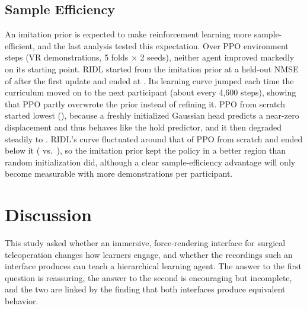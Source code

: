 \documentclass[utf8]{frontiers_suppmat}
\begin{document}
\begin{table}[!htb]
\centering
\caption{\textbf{Demonstration source $\times$ test interface} for full RIDL. Held-out position error (mm, mean $\pm$ SD over folds, seeds and recordings).}
\vspace{0.5em}
\label{tab:crossdomain}
\end{table}

\subsection{Sample Efficiency}
An imitation prior is expected to make reinforcement learning more sample-efficient, and the last analysis tested this expectation. Over \cSteps{} PPO environment steps (VR demonstrations, 5 folds $\times$ 2 seeds), neither agent improved markedly on its starting point. RIDL started from the imitation prior at a held-out NMSE of \cRidlFirst{} after the first update and ended at \cRidlFinal{}. Its learning curve jumped each time the curriculum moved on to the next participant (about every 4,600 steps), showing that PPO partly overwrote the prior instead of refining it. PPO from scratch started lowest (\cPpoFirst{}), because a freshly initialized Gaussian head predicts a near-zero displacement and thus behaves like the hold predictor, and it then degraded steadily to \cPpoFinal{}. RIDL's curve fluctuated around that of PPO from scratch and ended below it (\cRidlFinal{} vs.\ \cPpoFinal{}), so the imitation prior kept the policy in a better region than random initialization did, although a clear sample-efficiency advantage will only become measurable with more demonstrations per participant.

\section{Discussion}

This study asked whether an immersive, force-rendering interface for surgical teleoperation changes how learners engage, and whether the recordings such an interface produces can teach a hierarchical learning agent. The answer to the first question is reassuring, the answer to the second is encouraging but incomplete, and the two are linked by the finding that both interfaces produce equivalent behavior.
\end{document}
